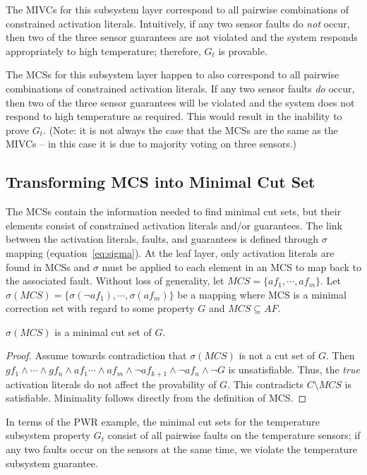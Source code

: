 The MIVCs for this subsystem layer correspond to all pairwise combinations of constrained activation literals. Intuitively, if any two sensor faults do {\em not} occur, then two of the three sensor guarantees are not violated and the system responds appropriately to high temperature; therefore, $G_t$ is provable. 

The MCSs for this subsystem layer happen to also correspond to all pairwise combinations of constrained activation literals. If any two sensor faults {\em do} occur, then two of the three sensor guarantees will be violated and the system does not respond to high temperature as required. This would result in the inability to prove $G_t$. (Note: it is not always the case that the MCSs are the same as the MIVCs -- in this case it is due to majority voting on three sensors.)

\subsection{Transforming MCS into Minimal Cut Set}
The MCSs contain the information needed to find minimal cut sets, but their elements consist of constrained activation literals and/or guarantees. The link between the activation literals, faults, and guarantees is defined through $\sigma$ mapping (equation~\ref{eq:sigma}). At the leaf layer, only activation literals are found in MCSs and $\sigma$ must be applied to each element in an MCS to map back to the associated fault. Without loss of generality, let $MCS = \{af_1, \cdots, af_m\}$. Let $\sigma (MCS) = \{\sigma (\neg af_{1}), \cdots, \sigma (af_{m})\}$ be a mapping where MCS is a minimal correction set with regard to some property $G$ and $MCS  \subseteq AF$. 

\begin{lemma} $\sigma (MCS)$ is a minimal cut set of $G$. 
\begin{proof}
Assume towards contradiction that $\sigma (MCS)$ is not a cut set of $G$. Then $gf_1 \land \cdots \land gf_n \land af_1 \cdots \land af_m \land \neg af_{k+1} \land \neg af_n \land \neg G$ is unsatisfiable. Thus, the \emph{true} activation literals do not affect the provability of $G$. This contradicts $C \setminus MCS$ is satisfiable. 
Minimality follows directly from the definition of MCS.
\end{proof}
\end{lemma}

In terms of the PWR example, the minimal cut sets for the temperature subsystem property $G_t$ consist of all pairwise faults on the temperature sensors; if any two faults occur on the sensors at the same time, we violate the temperature subsystem guarantee. 

